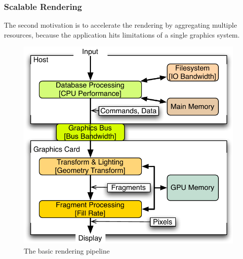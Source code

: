 \documentclass[10pt,a4paper]{scrartcl}
\begin{document}
\subsubsection{Scalable Rendering}
The second motivation is to accelerate the rendering by aggregating
multiple resources, because the application hits limitations of a single
graphics system.

\begin{figure}[ht]
\centering
\includegraphics[width=0.45\columnwidth]{images/pipeline.pdf}
\caption{The basic rendering pipeline}
\label{FIG_pipeline}
\end{figure}
\end{document}
